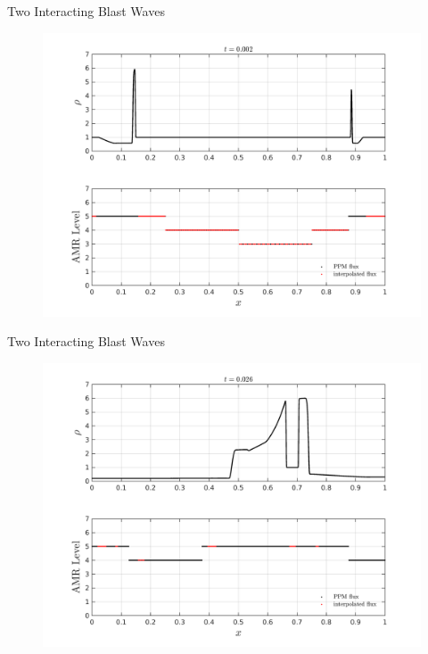 \documentclass{beamer}
\begin{document}
\begin{frame}{Two Interacting Blast Waves}
  \begin{figure}
    \center
    \includegraphics[scale=0.4]{blast2_early.png}
  \end{figure}
\end{frame}

\begin{frame}{Two Interacting Blast Waves}
  \begin{figure}
    \center
    \includegraphics[scale=0.4]{blast2_late.png}
  \end{figure}
\end{frame}
\end{document}
